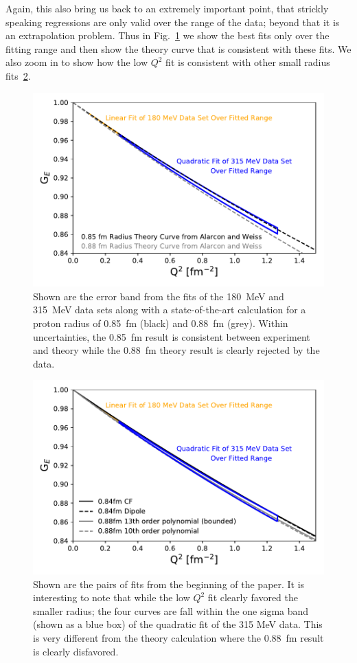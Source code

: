 \documentclass[10pt,aps,prc,twocolumn]{revtex4-1}
\begin{document}
Again, this also bring us back to an extremely important point, that strickly speaking regressions are only 
valid over the range of the data; beyond that it is an extrapolation problem.
Thus in Fig.~\ref{FitsAndTheory} we show the best fits only over the fitting range and then show the theory
curve that is consistent with these fits.   We also zoom in to show how the low $Q^2$ fit is consistent with
other small radius fits~\ref{FitsAndOtherFits}.

\begin{figure}[htb]
\includegraphics[width=\columnwidth]{Figure/FitsAndTheory.pdf}
\caption{Shown are the error band from the fits of the 180~MeV and 315~MeV data sets along with a state-of-the-art
calculation for a proton radius of 0.85~fm (black) and 0.88~fm (grey).   Within uncertainties, the 0.85~fm result is
consistent between experiment and theory while the 0.88~fm theory result is clearly rejected by the data.}
\label{FitsAndTheory}
\end{figure}

\begin{figure}[htb]
\includegraphics[width=\columnwidth]{Figure/FitsAndFits.pdf}
\caption{Shown are the pairs of fits from the beginning of the paper.   It is interesting to note that while the
low $Q^2$ fit clearly favored the smaller radius; the four curves are fall within the one sigma band (shown as a blue box) 
of the quadratic fit of the 315 MeV data.   This is very different from the theory calculation where the 0.88~fm result
is clearly disfavored.}
\label{FitsAndOtherFits}
\end{figure}
\end{document}
